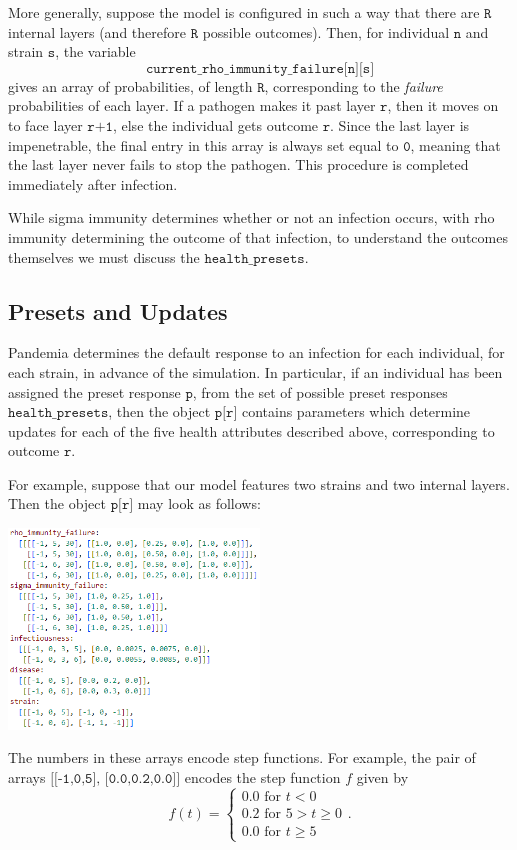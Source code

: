 \documentclass[10pt,letterpaper]{article}
\begin{document}
More generally, suppose the model is configured in such a way that there are $\texttt{R}$ internal layers (and therefore $\texttt{R}$ possible outcomes). Then, for individual $\texttt{n}$ and strain $\texttt{s}$, the variable $$\texttt{current{\_}rho{\_}immunity{\_}failure[n][s]}$$ gives an array of probabilities, of length $\texttt{R}$, corresponding to the \textit{failure} probabilities of each layer. If a pathogen makes it past layer $\texttt{r}$, then it moves on to face layer $\texttt{r+1}$, else the individual gets outcome $\texttt{r}$. Since the last layer is impenetrable, the final entry in this array is always set equal to $\texttt{0}$, meaning that the last layer never fails to stop the pathogen. This procedure is completed immediately after infection.

While sigma immunity determines whether or not an infection occurs, with rho immunity determining the outcome of that infection, to understand the outcomes themselves we must discuss the $\texttt{health{\_}presets}$.

\subsection*{Presets and Updates}

Pandemia determines the default response to an infection for each individual, for each strain, in advance of the simulation. In particular, if an individual has been assigned the preset response $\texttt{p}$, from the set of possible preset responses $\texttt{health{\_}presets}$, then the object $\texttt{p[r]}$ contains parameters which determine updates for each of the five health attributes described above, corresponding to outcome $\texttt{r}$.

For example, suppose that our model features two strains and two internal layers. Then the object $\texttt{p[r]}$ may look as follows:
\begin{center}
\includegraphics[width=0.5\textwidth]{codeexample}
\end{center}
The numbers in these arrays encode step functions. For example, the pair of arrays $\texttt{[[-1,0,5], [0.0,0.2,0.0]]}$ encodes the step function $f$ given by
\begin{equation}
f(t) =
\begin{cases}
0.0 \text{ for } t < 0 \\
0.2 \text{ for } 5 > t \geq 0 \\
0.0 \text{ for } t \geq 5
\end{cases}.
\end{equation}
\end{document}
